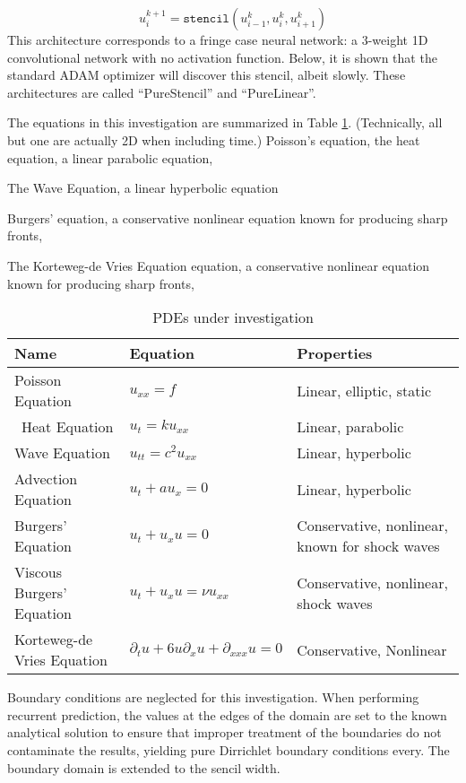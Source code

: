 \documentclass{article}
\begin{document}
\begin{equation}
  u^{k+1}_{i} = \mathtt{stencil}\left( u^k_{i-1}, u^k_{i},u^{k}_{i+1}\right)
\end{equation}
This architecture corresponds to a fringe case neural network: a 3-weight 1D convolutional network with no activation function. Below, it is shown that the standard ADAM optimizer will discover this stencil, albeit slowly.
These architectures are called ``PureStencil'' and ``PureLinear''.

The equations in this investigation are summarized in Table \ref{tab:pdes}. (Technically, all but one are actually 2D when including time.)
Poisson's equation, the heat equation, a linear parabolic equation,

The Wave Equation, a linear hyperbolic equation

  Burgers' equation, a conservative nonlinear equation known for
  producing sharp fronts,

The Korteweg-de Vries Equation equation, a conservative nonlinear equation known for
  producing sharp fronts,

\begin{table}
  \caption{\label{tab:pdes}PDEs under investigation}
  \begin{tabular}{lll}
    \hline
    Name & Equation & Properties\\
    \hline\hline
    Poisson Equation & $u_{xx} = f $ & Linear, elliptic, static \\\hline\
    Heat Equation & $u_{t} = k u_{xx} $ & Linear, parabolic \\\hline
    Wave Equation & $u_{tt} = c^2 u_{xx} $ & Linear, hyperbolic\\\hline
    Advection Equation & $u_{t} + a u_x = 0 $ & Linear, hyperbolic\\\hline
    Burgers' Equation & $u_{t} + u_x u = 0 $ & Conservative, nonlinear, known for shock waves \\\hline
    Viscous Burgers' Equation & $u_{t} + u_x u = \nu u_{xx} $ & Conservative, nonlinear, shock waves \\\hline
    Korteweg-de Vries Equation & $\partial_t u + 6 u \partial_x u + \partial_{xxx}u = 0$ & Conservative, Nonlinear \\\hline
  \end{tabular}
\end{table}

Boundary conditions are neglected for this investigation. When
performing recurrent prediction, the values at the edges of the domain are set to
the known analytical solution to ensure that improper treatment of the
boundaries do not contaminate the results, yielding pure Dirrichlet
boundary conditions every. The boundary domain is extended to the
sencil width.
\end{document}
